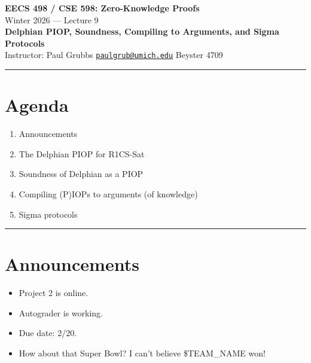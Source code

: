 \documentclass[11pt]{article}
\theoremstyle{plain}
\theoremstyle{definition}
\begin{document}
\begin{center}
  {\LARGE \textbf{EECS 498 / CSE 598: Zero-Knowledge Proofs}}\\[6pt]
  {\large Winter 2026 \quad --- \quad Lecture 9}\\[4pt]
  {\large \textbf{Delphian PIOP, Soundness, Compiling to Arguments, and Sigma Protocols}}\\[4pt]
  {\normalsize Instructor: Paul Grubbs \quad
    \href{mailto:paulgrub@umich.edu}{\texttt{paulgrub@umich.edu}} \quad
    Beyster 4709}
\end{center}

\hrule
\vspace{10pt}

\section*{Agenda}
\begin{enumerate}
  \item Announcements
  \item The Delphian PIOP for R1CS-Sat
  \item Soundness of Delphian as a PIOP
  \item Compiling (P)IOPs to arguments (of knowledge)
  \item Sigma protocols
\end{enumerate}

\hrule
\vspace{10pt}

\section{Announcements}

\begin{itemize}
  \item Project 2 is online.
  \item Autograder is working.
  \item Due date: 2/20.
  \item How about that Super Bowl? I can't believe \$TEAM\_NAME won!
\end{itemize}
\end{document}
